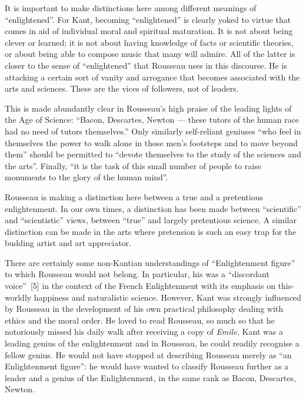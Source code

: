 \begin{multicols}{2}
It is important to make distinctions here among different meanings of ``enlightened''. For Kant, becoming ``enlightened'' is
clearly yoked to virtue that comes in aid of individual moral and spiritual maturation. It is not about being clever or learned; it
is not about having knowledge of facts or scientific theories, or about being able to compose music that many will admire. All
of the latter is closer to the sense of ``enlightened'' that Rousseau uses in this discourse. He is attacking a certain sort of vanity
and arrogance that becomes associated with the arts and sciences. These are the vices of followers, not of leaders.

This is made abundantly clear in Rousseau’s high praise of the leading lights of the Age of Science: ``Bacon, Descartes, Newton
--- these tutors of the human race had no need of tutors themselves.'' Only similarly self-reliant geniuses ``who feel in
themselves the power to walk alone in those men's footsteps and to move beyond them'' should be permitted to ``devote
themselves to the study of the sciences and the arts''. Finally, ``it is the task of this small number of people to raise monuments
to the glory of the human mind''.

Rousseau is making a distinction here between a true and a pretentious enlightenment. In our own times, a distinction has
been made between ``scientific'' and ``scientistic'' views, between ``true'' and largely pretentious science. A similar distinction
can be made in the arts where pretension is such an easy trap for the budding artist and art appreciator.

There are certainly some non-Kantian understandings of ``Enlightenment figure'' to which Rousseau would not belong. In
particular, his was a ``discordant voice''~[5] in the context of the French Enlightenment with its emphasis on this-worldly
happiness and naturalistic science. However, Kant was strongly influenced by Rousseau in the development of his own
practical philosophy dealing with ethics and the moral order. He loved to read Rousseau, so much so that he notoriously
missed his daily walk after receiving a copy of \emph{Emile.} Kant was a leading genius of the enlightenment and in Rousseau, he
could readily recognise a fellow genius. He would not have stopped at describing Rousseau merely as ``an Enlightenment
figure'': he would have wanted to classify Rousseau further as a leader and a genius of the Enlightenment, in the same rank as
Bacon, Descartes, Newton.

\bigskip


\end{multicols}
